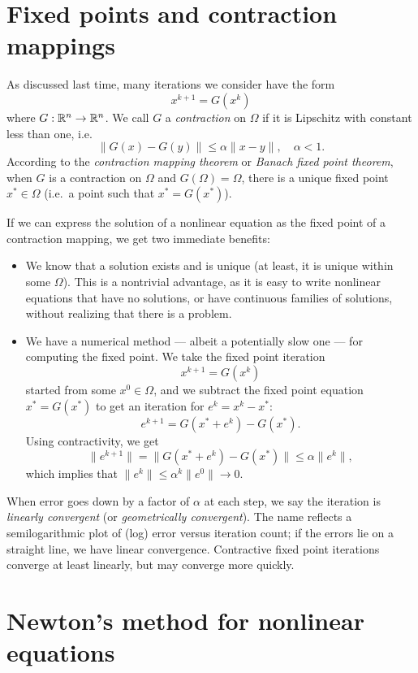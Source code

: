 \documentclass[12pt, leqno]{article} %
\begin{document}

\section*{Fixed points and contraction mappings}

As discussed last time, many iterations we consider have the form
\[
  x^{k+1} = G(x^k)
\]
where $G : \mathbb{R}^n \rightarrow \mathbb{R}^n$.  We call $G$ a
{\em contraction} on $\Omega$ if it is Lipschitz with constant less
than one, i.e.
\[
  \|G(x)-G(y)\| \leq \alpha \|x-y\|, \quad \alpha < 1.
\]
According to the {\em contraction mapping theorem} or
{\em Banach fixed point theorem}, when $G$ is a contraction
on $\Omega$ and $G(\Omega) = \Omega$, there
is a unique fixed point $x^* \in \Omega$
(i.e.~a point such that $x^* = G(x^*)$).

If we can express the solution of a nonlinear equation as
the fixed point of a contraction mapping, we get two immediate
benefits:
\begin{itemize}
\item We know that a solution exists and is unique (at least, it is
  unique within some $\Omega$).  This is a nontrivial advantage, as
  it is easy to write nonlinear equations that have no solutions,
  or have continuous families of solutions, without realizing that
  there is a problem.
\item We have a numerical method --- albeit a potentially slow one ---
  for computing the fixed point.  We take the fixed point iteration
  \[
    x^{k+1} = G(x^k)
  \]
  started from some $x^0 \in \Omega$, and we subtract the fixed
  point equation $x^* = G(x^*)$ to get an iteration for $e^k = x^k-x^*$:
  \[
    e^{k+1} = G(x^* + e^k) - G(x^*).
  \]
  Using contractivity, we get
  \[
    \|e^{k+1}\| = \|G(x^* + e^k)-G(x^*)\| \leq \alpha \|e^k\|,
  \]
  which implies that $\|e^k\| \leq \alpha^k \|e^0\| \rightarrow 0$.  
\end{itemize}
When error goes down by a factor of $\alpha$ at each step, we say
the iteration is {\em linearly convergent} (or {\em geometrically
  convergent}).  The name reflects a semilogarithmic
plot of (log) error versus iteration count; if the errors lie on
a straight line, we have linear convergence.  Contractive fixed point iterations
converge at least linearly, but may converge more quickly.

\section*{Newton's method for nonlinear equations}
\end{document}
